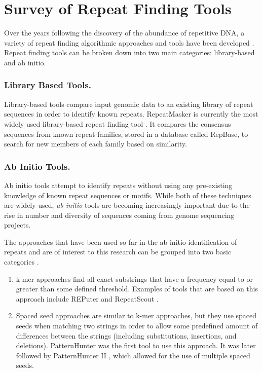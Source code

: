 
\section{Survey of Repeat Finding Tools}
Over the years following the discovery of the abundance of repetitive DNA, a variety of repeat finding algorithmic approaches and tools have been developed \cite{saha2008computational}. Repeat finding tools can be broken down into two main categories: library-based and ab initio.

\subsubsection{Library Based Tools. } Library-based tools compare input genomic data to an existing library of repeat sequences in order to identify known repeats. RepeatMasker \cite{smit1996repeatmasker} is currently the most widely used library-based repeat finding tool \cite{saha2008computational}. It compares the consensus sequences from known repeat families, stored in a database called RepBase, to search for new members of each family based on similarity.

\subsubsection{Ab Initio Tools. }Ab initio tools attempt to identify repeats without using any pre-existing knowledge of known repeat sequences or motifs. While both of these techniques are widely used, \textit{ab initio} tools are becoming increasingly important due to the rise in number and diversity of sequences coming from genome sequencing projects. 

The approaches that have been used so far in the ab initio identification of repeats and are of interest to this research can be grouped into two basic categories \cite{saha2008computational}.

\begin{enumerate}
\item{k-mer approaches find all exact substrings that have a frequency equal to or greater than some defined threshold. Examples of tools that are based on this approach include REPuter \cite{kurtz2001reputer} and RepeatScout \cite{price2005novo}.}
\item{Spaced seed approaches are similar to k-mer approaches, but they use spaced seeds when matching two strings in order to allow some predefined amount of differences between the strings (including substitutions, insertions, and deletions). PatternHunter \cite{ma2002patternhunter} was the first tool to use this approach. It was later followed by PatternHunter II \cite{li2003patternhunter2}, which allowed for the use of multiple spaced seeds.}
\end{enumerate}




